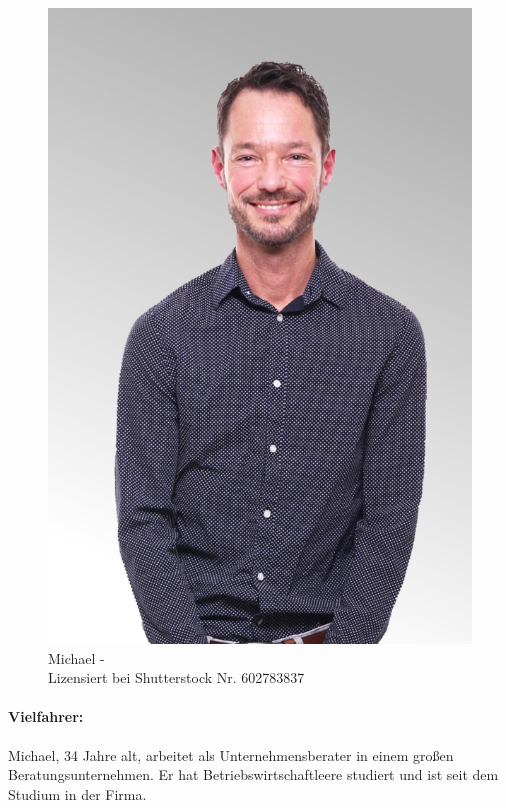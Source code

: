 \begin{figure}
    \vspace{-\intextsep}
    \centering
    \includegraphics[width=\textwidth]{contents/06_model_evaluation/01_integration/res/persona_picture_michael.png}
    \caption[]{Michael -\\Lizensiert bei Shutterstock Nr. 602783837}
\end{figure}

\paragraph{Vielfahrer:} Michael, 34 Jahre alt, arbeitet als Unternehmensberater in einem großen Beratungsunternehmen. Er hat Betriebswirtschaftleere studiert und ist seit dem Studium in der Firma.

